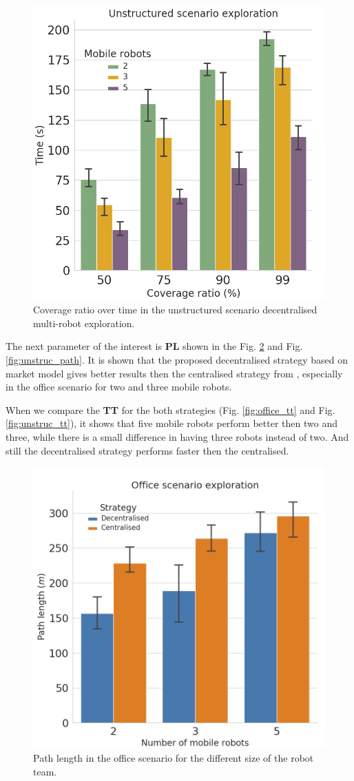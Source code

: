 \documentclass[letterpaper, 10 pt, conference]{ieeeconf}  %
\begin{document}
\begin{figure}[h!]
	\centering\includegraphics[width=0.7\columnwidth]{unstructured_coverage_decent.png}
	\caption{Coverage ratio over time in the unstructured scenario decentralised multi-robot exploration.}
	\label{fig:unstruc_decent}
\end{figure}

The next parameter of the interest is \textbf{PL} shown in the Fig. \ref{fig:office_path} and Fig. \ref{fig:unstruc_path}. It is shown that the proposed decentralised strategy based on market model gives better results then the centralised strategy from \cite{burgard}, especially in the office scenario for two and three mobile robots. 


When we compare the \textbf{TT} for the both strategies (Fig. \ref{fig:office_tt} and Fig. \ref{fig:unstruc_tt}), it shows that five mobile robots perform better then two and three, while there is a small difference in having three robots instead of two. And still the decentralised strategy performs faster then the centralised. 
\begin{figure}[h!]
	\centering\includegraphics[width=0.7\columnwidth]{office_path_length.png}
	\caption{Path length in the office scenario for the different size of the robot team.}
	\label{fig:office_path}
\end{figure}
\end{document}
